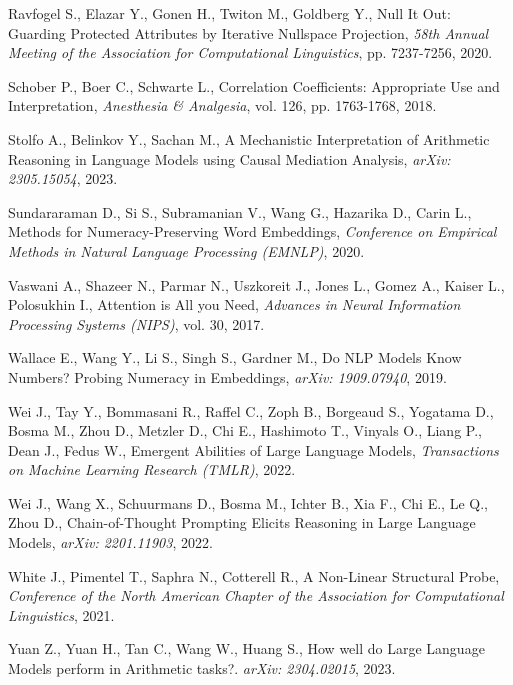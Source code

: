 \documentclass[final,1p,times,authoryear]{elsarticle}
\begin{document}
\begin{thebibliography}{00}
Ravfogel S., Elazar Y., Gonen H., Twiton M., Goldberg Y., Null It Out: Guarding Protected Attributes by Iterative Nullspace Projection, {\em 58th Annual Meeting of the Association for Computational Linguistics}, pp. 7237-7256, 2020.

Schober P., Boer C., Schwarte L., Correlation Coefficients: Appropriate Use and Interpretation, {\em Anesthesia \& Analgesia}, vol. 126, pp. 1763-1768, 2018.

Stolfo A., Belinkov Y., Sachan M., A Mechanistic Interpretation of Arithmetic Reasoning in Language Models using Causal Mediation Analysis, {\em arXiv: 2305.15054}, 2023.

Sundararaman D., Si S., Subramanian V., Wang G., Hazarika D., Carin L., Methods for Numeracy-Preserving Word Embeddings, {\em Conference on Empirical Methods in Natural Language Processing (EMNLP)}, 2020.

Vaswani A., Shazeer N., Parmar N., Uszkoreit J., Jones L., Gomez A., Kaiser L., Polosukhin I., Attention is All you Need, {\em Advances in Neural Information Processing Systems (NIPS)}, vol. 30, 2017.

Wallace E., Wang Y., Li S., Singh S., Gardner M., Do NLP Models Know Numbers? Probing Numeracy in Embeddings, {\em arXiv: 1909.07940}, 2019.

Wei J., Tay Y., Bommasani R., Raffel C., Zoph B., Borgeaud S., Yogatama D., Bosma M., Zhou D., Metzler D., Chi E., Hashimoto T., Vinyals O., Liang P., Dean J., Fedus W., Emergent Abilities of Large Language Models, {\em Transactions on Machine Learning Research (TMLR)}, 2022.

Wei J., Wang X., Schuurmans D., Bosma M., Ichter B., Xia F., Chi E., Le Q., Zhou D., Chain-of-Thought Prompting Elicits Reasoning in Large Language Models, {\em arXiv: 2201.11903}, 2022.

White J., Pimentel T., Saphra N., Cotterell R., A Non-Linear Structural Probe, {\em Conference of the North American Chapter of the Association for Computational Linguistics}, 2021.

Yuan Z., Yuan H., Tan C., Wang W., Huang S., How well do Large Language Models perform in Arithmetic tasks?. {\em arXiv: 2304.02015}, 2023.

\end{thebibliography}
\end{document}
